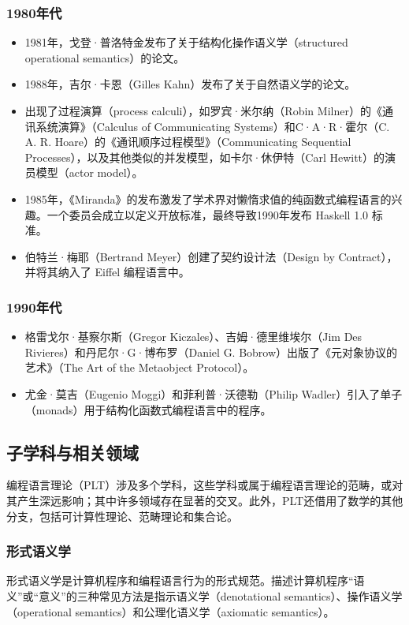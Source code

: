 \subsubsection{1980年代}  
\begin{itemize}
\item 1981年，戈登·普洛特金发布了关于结构化操作语义学（structured operational semantics）的论文。  
\item 1988年，吉尔·卡恩（Gilles Kahn）发布了关于自然语义学的论文。  
\item 出现了过程演算（process calculi），如罗宾·米尔纳（Robin Milner）的《通讯系统演算》（Calculus of Communicating Systems）和C·A·R·霍尔（C. A. R. Hoare）的《通讯顺序过程模型》（Communicating Sequential Processes），以及其他类似的并发模型，如卡尔·休伊特（Carl Hewitt）的演员模型（actor model）。  
\item 1985年，《Miranda》的发布激发了学术界对懒惰求值的纯函数式编程语言的兴趣。一个委员会成立以定义开放标准，最终导致1990年发布 Haskell 1.0 标准。  
\item 伯特兰·梅耶（Bertrand Meyer）创建了契约设计法（Design by Contract），并将其纳入了 Eiffel 编程语言中。
\end{itemize}
\subsubsection{1990年代}
\begin{itemize}
\item 格雷戈尔·基察尔斯（Gregor Kiczales）、吉姆·德里维埃尔（Jim Des Rivieres）和丹尼尔·G·博布罗（Daniel G. Bobrow）出版了《元对象协议的艺术》（The Art of the Metaobject Protocol）。  
\item 尤金·莫吉（Eugenio Moggi）和菲利普·沃德勒（Philip Wadler）引入了单子（monads）用于结构化函数式编程语言中的程序。
\end{itemize}
\subsection{子学科与相关领域}  
编程语言理论（PLT）涉及多个学科，这些学科或属于编程语言理论的范畴，或对其产生深远影响；其中许多领域存在显著的交叉。此外，PLT还借用了数学的其他分支，包括可计算性理论、范畴理论和集合论。
\subsubsection{形式语义学}  
形式语义学是计算机程序和编程语言行为的形式规范。描述计算机程序“语义”或“意义”的三种常见方法是指示语义学（denotational semantics）、操作语义学（operational semantics）和公理化语义学（axiomatic semantics）。
